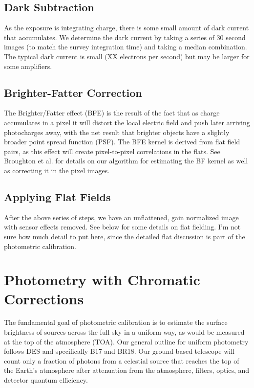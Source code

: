 \documentclass[SE,authoryear,lsstdraft,toc]{lsstdoc}
\begin{document}
\subsection{Dark Subtraction}

As the exposure is integrating charge, there is some small amount of dark
current that accumulates.  We determine the dark current by taking a series of
30 second images (to match the survey integration time) and taking a median
combination.  The typical dark current is small (XX electrons per second) but
may be larger for some amplifiers.

\subsection{Brighter-Fatter Correction}

The Brighter/Fatter effect (BFE) is the result of the fact that as charge
accumulates in a pixel it will distort the local electric field and push later
arriving photocharges away, with the net result that brighter objects have a
slightly broader point spread function (PSF).  The BFE kernel is derived from
flat field pairs, as this effect will create pixel-to-pixel correlations in the
flats.  See Broughton et al. for details on our algorithm for estimating the BF
kernel as well as correcting it in the pixel images.

\subsection{Applying Flat Fields}

After the above series of steps, we have an unflattened, gain normalized image
with sensor effects removed.  See below for some details on flat fielding.  I'm
not sure how much detail to put here, since the detailed flat discussion is
part of the photometric calibration.

\section{Photometry with Chromatic Corrections}
\label{sec:photocal}

The fundamental goal of photometric calibration is to estimate the surface
brightness of sources across the full sky in a uniform way, as would be
measured at the top of the atmosphere (TOA).  Our general outline for uniform
photometry follows DES and specifically B17 and BR18.  Our ground-based
telescope will count only a fraction of photons from a celestial source that
reaches the top of the Earth's atmosphere after attenuation from the
atmosphere, filters, optics, and detector quantum efficiency.
\end{document}
